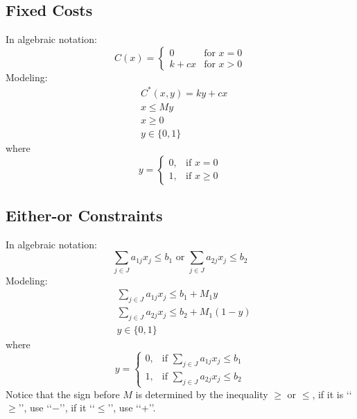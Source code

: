 			\subsection{Fixed Costs}
				In algebraic notation: 
				\begin{equation}
					C(x) = \begin{cases} 0 & \text{for } x=0 \\ k + cx & \text{for } x > 0 \end{cases} 
				\end{equation}
				Modeling:
				\begin{align}
					& C^*(x, y) = ky+cx\\
					& x \le My  \\
					& x \ge 0 \\
					& y \in \{0, 1\} 
				\end{align}
				where
				\begin{equation}y=\begin{cases}0, & \text{if }x=0 \\ 1, & \text{if }x\ge 0\end{cases} \end{equation}

			\subsection{Either-or Constraints}
				In algebraic notation: 
				\begin{equation}
					\sum_{j\in J} a_{1j} x_j \le b_1 \text{ or } \sum_{j\in J} a_{2j} x_j \le b_2 
				\end{equation}
				Modeling:
				\begin{align}
					& \sum_{j\in J} a_{1j} x_j \le b_1 + M_1y  \\
					& \sum_{j\in J} a_{2j} x_j \le b_2 + M_1(1-y)  \\
					& y \in \{0, 1\} 
				\end{align}
				where
				\begin{equation}y=\begin{cases}0, & \text{if }\sum_{j\in J} a_{1j} x_j \le b_1 \\ 1, & \text{if } \sum_{j\in J} a_{2j} x_j \le b_2\end{cases} \end{equation}
				Notice that the sign before $M$ is determined by the inequality $\ge$ or $\le$, if it is \lq\lq{}$\ge$\rq\rq{}, use \lq\lq{}$-$\rq\rq{}, if it \lq\lq{}$\le$\rq\rq{}, use \lq\lq{}+\rq\rq{}.

